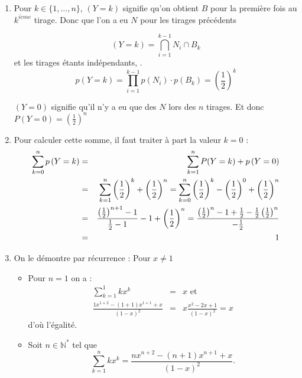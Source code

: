 \documentclass[a4paper, 11pt,reqno]{article}
\begin{document}
\begin{correction}
\begin{enumerate}
\item Pour $k\in \{1,\ldots ,n\}$, $\left( Y=k\right) $ signifie qu'on
obtient $B$ pour la premi\`{e}re fois au $k^{i\grave{e}me}$ tirage. Donc que
l'on a eu $N$ pour les tirages pr\'{e}c\'{e}dents

\begin{equation*}
\left( Y=k\right) =\bigcap_{i=1}^{k-1}N_{i}\cap B_{k}
\end{equation*}
et les tirages \'{e}tants ind\'{e}pendants, . 
\begin{equation*}
p\left( Y=k\right) =\prod_{i=1}^{k-1}p\left( N_{i}\right) \cdot p\left(
B_{k}\right) =\left( \frac{1}{2}\right) ^{k}
\end{equation*}

$\left( Y=0\right) $ signifie qu'il n'y a eu que des $N$ lors des $n$
tirages. Et donc $\displaystyle P(Y=0)=\left( \frac{1}{2}\right) ^{n}$

\item Pour calculer cette somme, il faut traiter \`{a} part la valeur $k=0$
: 
\begin{eqnarray*}
\sum_{k=0}^{n}p\left( Y=k\right) &=&\sum_{k=1}^{n}P(Y=k)+p\left( Y=0\right)
\\
&=&\sum_{k=1}^{n}\left( \frac{1}{2}\right) ^{k}+\left( \frac{1}{2}\right)
^{n}=\sum_{k=0}^{n}\left( \frac{1}{2}\right) ^{k}-\left( \frac{1}{2}\right)
^{0}+\left( \frac{1}{2}\right) ^{n} \\
&=&\frac{\left( \frac{1}{2}\right) ^{n+1}-1}{\frac{1}{2}-1}-1+\left( \frac{1%
}{2}\right) ^{n}=\frac{\left( \frac{1}{2}\right) ^{n}-1+\frac{1}{2}-\frac{1}{%
2}\left( \frac{1}{2}\right) ^{n}}{-\frac{1}{2}} \\
&=&1
\end{eqnarray*}

\item On le d\'{e}montre par r\'{e}currence : Pour $x\neq 1$

\begin{itemize}
\item Pour $n=1$ on a : 
\begin{eqnarray*}
\sum_{k=1}^{1}kx^{k} &=&x\mbox{ et } \\
\frac{1x^{1+2}-(1+1)x^{1+1}+x}{(1-x)^{2}} &=&x\frac{x^{2}-2x+1}{(1-x)^{2}}=x
\end{eqnarray*}
d'o\`{u} l'\'{e}galit\'{e}.

\item Soit $n\in \mathbb{N}^{*}$ tel que 
\begin{equation*}
\sum_{k=1}^{n}kx^{k}=\frac{nx^{n+2}-(n+1)x^{n+1}+x}{(1-x)^{2}}.
\end{equation*}


\end{itemize}
\end{enumerate}
\end{correction}
\end{document}
